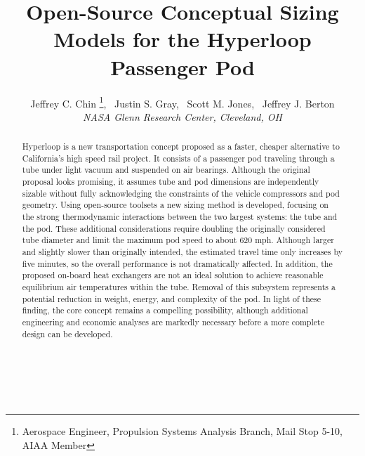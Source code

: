 \documentclass[]             %
{aiaa-tc}                       %
\title{Open-Source Conceptual Sizing Models for the Hyperloop Passenger Pod}
\author{
  Jeffrey C. Chin%
     \footnote{Aerospace Engineer, Propulsion Systems Analysis Branch, Mail Stop 5-10, AIAA Member},
  \ Justin S. Gray\footnotemark[\value{footnote}] ,%
  \ Scott M. Jones\footnotemark[\value{footnote}] ,%
  \ Jeffrey J. Berton\footnotemark[\value{footnote}]%
   \\
  {\normalsize\itshape
  NASA Glenn Research Center, Cleveland, OH}
}
\begin{document}
\maketitle

\begin{abstract}
Hyperloop is a new transportation concept proposed as a faster, cheaper alternative to California's high speed rail project.
It consists of a passenger pod traveling through a tube under light vacuum and suspended on air bearings.
Although the original proposal looks promising,
it assumes tube and pod dimensions are independently sizable without fully acknowledging
the constraints of the vehicle compressors and pod geometry.
Using open-source toolsets a new sizing method is developed, focusing on 
the strong thermodynamic interactions between the two largest systems: the tube and the pod.
These additional considerations require doubling the originally considered tube diameter
and limit the maximum pod speed to about 620 mph.
Although larger and slightly slower than originally intended, the estimated travel time only increases by five minutes,
so the overall performance is not dramatically affected.
In addition, the proposed on-board heat exchangers are not an ideal solution
to achieve reasonable equilibrium air temperatures within the tube.
Removal of this subsystem represents a potential reduction in weight, energy, and complexity of the pod.
In light of these finding, the core concept remains a compelling possibility,
although additional engineering and economic analyses are markedly necessary before a more complete design can be developed.
\\
\\
\\
\\

\end{abstract}  

\setcounter{secnumdepth}{1}
\setcounter{tocdepth}{1}
\printnomenclature
 




%
\end{document}

